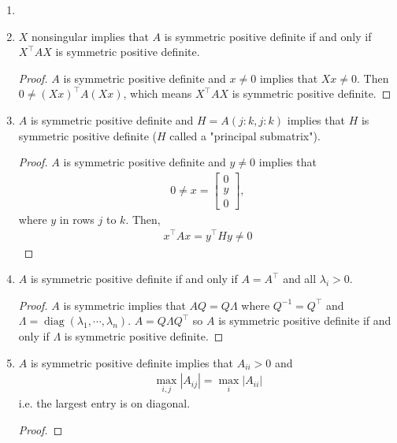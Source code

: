 \documentclass[11pt]{article}
\numberwithin{equation}{section}
\begin{document}
\begin{lemma}
    \begin{enumerate}
        \item[]
        \item  $X$ nonsingular implies that $A$ is symmetric positive definite if and only if $X^\top AX$ is symmetric positive definite.\begin{proof}
            $A$ is symmetric positive definite and $x \neq 0$ implies that $Xx \neq 0$. Then $0\neq \left(Xx\right)^{\top} A\left(X{x}\right)$, 
            which means $X^\top AX$ is symmetric positive definite.
        \end{proof}
        \item $A$ is symmetric positive definite and $H = A(j:k,j:k)$ implies that $H$ is symmetric positive definite ($H$ called a "principal submatrix").\begin{proof}
            $A$ is symmetric positive definite and $y \neq 0$ implies that \begin{align*}
                0 \neq x = \left[\begin{array}{l}
                    0 \\
                    y \\
                    0
                    \end{array}\right],
            \end{align*}
            where $y$ in rows $j$ to $k$. Then, \begin{align*}
                x^\top Ax = y^\top Hy \neq 0
            \end{align*}
        \end{proof}
        \item $A$ is symmetric positive definite if and only if $A=A^\top$ and all $\lambda_i > 0$. \begin{proof}
            $A$ is symmetric implies that $AQ = Q\Lambda$ where $Q^{-1} = Q^\top$ and $\Lambda = \operatorname{diag}(\lambda_1, \cdots, \lambda_n)$. $A=Q\Lambda Q^\top$
            so $A$ is symmetric positive definite if and only if $\Lambda$ is symmetric positive definite.
        \end{proof}
        \item $A$ is symmetric positive definite implies that $A_{ii}>0$ and \begin{align*}
            \max _{i, j}|A_{ij}|=\max_{i} |A_{ii}|
        \end{align*}
        i.e. the largest entry is on diagonal.
        \begin{proof}

\end{proof}
\end{enumerate}
\end{lemma}
\end{document}
